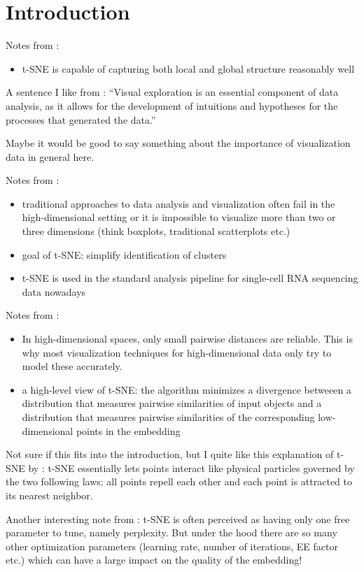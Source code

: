 \chapter{Introduction}
Notes from \cite{vdMaa08}: 
\begin{itemize}
    \item t-SNE is capable of capturing both local and global structure reasonably well 
\end{itemize}
A sentence I like from \cite{vdMaa14}: \enquote{Visual exploration is an essential component of data analysis, as it allows for the development of intuitions and hypotheses for the processes that generated the data.}


Maybe it would be good to say something about the importance of visualization data in general here. 

Notes from \cite{LinStei22}:
\begin{itemize}
    \item traditional approaches to data analysis and visualization often fail in the high-dimen\-sio\-nal setting or it is impossible to visualize more than two or three dimensions (think boxplots, traditional scatterplots etc.)
    \item goal of t-SNE: simplify identification of clusters 
    \item t-SNE is used in the standard analysis pipeline for single-cell RNA sequencing data nowadays
\end{itemize}

Notes from \cite{vdMaa14}:
\begin{itemize}
    \item In high-dimensional spaces, only small pairwise distances are reliable. This is why most visualization techniques for high-dimensional data only try to model these accurately. 
    \item a high-level view of t-SNE: the algorithm minimizes a divergence betweeen a distribution that measures pairwise similarities of input objects and a distribution that measures pairwise similarities of the corresponding low-dimensional points in the embedding 
\end{itemize}

Not sure if this fits into the introduction, but I quite like this explanation of t-SNE by \cite{KoBe19SingleCell}: t-SNE essentially lets points interact like physical particles governed by the two following laws: all points repell each other and each point is attracted to its nearest neighbor.

Another interesting note from \cite{KoBe19SingleCell}: t-SNE is often perceived as having only one free parameter to tune, namely perplexity. But under the hood there are so many other optimization parameters (learning rate, number of iterations, EE factor etc.) which can have a large impact on the quality of the embedding! 